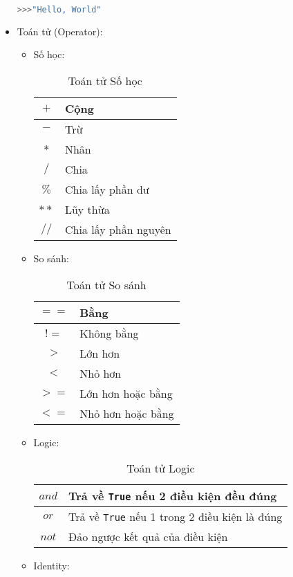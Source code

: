 \begin{itemize}
\begin{lstlisting}[language=Python]
>>>"Hello, World"
	\end{lstlisting}
	\item Toán tử (Operator):
	\begin{itemize}
		\item Số học:
		\begin{table}[h!]
			\centering
			\begin{tabular}{|c|l|}
				\hline
				$+$ & Cộng\\
				\hline
				$-$ & Trừ\\
				\hline
				$*$ & Nhân\\
				\hline
				$/$ & Chia\\
				\hline
				$\%$ & Chia lấy phần dư\\
				\hline
				$**$ & Lũy thừa\\
				\hline
				$//$ & Chia lấy phần nguyên\\
				\hline
			\end{tabular}
			\caption{Toán tử Số học}
		\end{table}
		\item So sánh:
		\begin{table}[h!]
			\centering
			\begin{tabular}{|c|l|}
				\hline
				$==$ & Bằng\\
				\hline
				$!=$ & Không bằng\\
				\hline
				$>$ & Lớn hơn\\
				\hline
				$<$ & Nhỏ hơn\\
				\hline
				$>=$ & Lớn hơn hoặc bằng\\
				\hline
				$<=$ & Nhỏ hơn hoặc bằng\\
				\hline
			\end{tabular}
			\caption{Toán tử So sánh}
		\end{table}
		\item Logic:
		\begin{table}[h!]
			\centering
			\begin{tabular}{|c|l|}
				\hline
				$and$ & Trả về \texttt{True} nếu 2 điều kiện đều đúng\\
				\hline
				$or$ & Trả về \texttt{True} nếu 1 trong 2 điều kiện là đúng\\
				\hline
				$not$ & Đảo ngược kết quả của điều kiện\\
				\hline
			\end{tabular}
			\caption{Toán tử Logic}
		\end{table}
		\item Identity:
		\begin{table}[h!]

\end{table}
\end{itemize}
\end{itemize}
